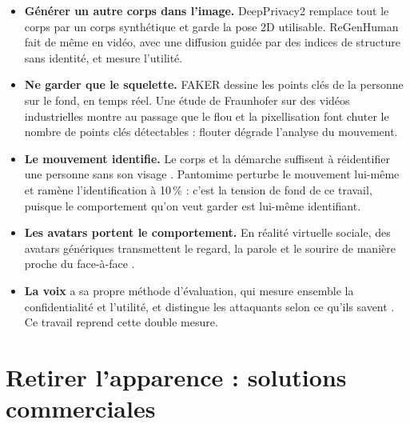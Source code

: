 \documentclass[11pt,a4paper]{report}
\begin{document}
\begin{itemize}
    \item \textbf{Générer un autre corps dans l'image.} DeepPrivacy2 \cite{hukkelas2023deepprivacy2} remplace tout le corps par un
    corps synthétique et garde la pose 2D utilisable. ReGenHuman \cite{regenhuman2026} fait de même en vidéo, avec une diffusion
    guidée par des indices de structure sans identité, et mesure l'utilité.
    \item \textbf{Ne garder que le squelette.} FAKER \cite{faker2025} dessine les points clés de la personne sur le fond, en temps
    réel. Une étude de Fraunhofer sur des vidéos industrielles montre au passage que le flou et la pixellisation font chuter le
    nombre de points clés détectables \cite{fraunhofer2025anonymization} : flouter dégrade l'analyse du mouvement.
    \item \textbf{Le mouvement identifie.} Le corps et la démarche suffisent à réidentifier une personne sans son visage
    \cite{mirage2026, hanisch2023gait}. Pantomime \cite{pantomime2026} perturbe le mouvement lui-même et ramène l'identification à
    10\,\% : c'est la tension de fond de ce travail, puisque le comportement qu'on veut garder est lui-même identifiant.
    \item \textbf{Les avatars portent le comportement.} En réalité virtuelle sociale, des avatars génériques transmettent le regard,
    la parole et le sourire de manière proche du face-à-face \cite{ijhcs2025avatars}.
    \item \textbf{La voix} a sa propre méthode d'évaluation, qui mesure ensemble la confidentialité et l'utilité, et distingue les
    attaquants selon ce qu'ils savent \cite{voiceprivacy2020}. Ce travail reprend cette double mesure.
\end{itemize}

\section{Retirer l'apparence : solutions commerciales}
\label{sec:sota-commercial}
\end{document}

